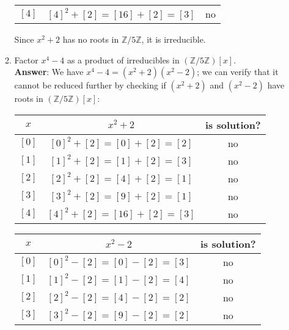 \documentclass{article}
\begin{document}
\begin{enumerate}
\begin{enumerate}
\begin{center}
\begin{tabular}{c|c|c}
                                    $[4]$ & $[4]^2+[2]=[16]+[2]=[3]$ & no
                              \end{tabular}
                        \end{center}
                        Since $x^2+2$ has no roots in $\mathbb{Z}/5\mathbb{Z}$, it is irreducible.
                  \item Factor $x^4-4$ as a product of irreducibles in $(\mathbb{Z}/5\mathbb{Z})[x]$.\\
                        \textbf{Answer}: We have $x^4-4=(x^2+2)(x^2-2)$; we can verify that it cannot be reduced further by checking if $(x^2+2)$ and $(x^2-2)$ have roots in $(\mathbb{Z}/5\mathbb{Z})[x]$:
                        \begin{center}
                              \begin{tabular}{c|c|c}
                                    $x$   & $x^2+2$                  & is solution? \\
                                    \hline
                                    $[0]$ & $[0]^2+[2]=[0]+[2]=[2]$  & no           \\
                                    $[1]$ & $[1]^2+[2]=[1]+[2]=[3]$  & no           \\
                                    $[2]$ & $[2]^2+[2]=[4]+[2]=[1]$  & no           \\
                                    $[3]$ & $[3]^2+[2]=[9]+[2]=[1]$  & no           \\
                                    $[4]$ & $[4]^2+[2]=[16]+[2]=[3]$ & no
                              \end{tabular}
                        \end{center}
                        \begin{center}
                              \begin{tabular}{c|c|c}
                                    $x$   & $x^2-2$                  & is solution? \\
                                    \hline
                                    $[0]$ & $[0]^2-[2]=[0]-[2]=[3]$  & no           \\
                                    $[1]$ & $[1]^2-[2]=[1]-[2]=[4]$  & no           \\
                                    $[2]$ & $[2]^2-[2]=[4]-[2]=[2]$  & no           \\
                                    $[3]$ & $[3]^2-[2]=[9]-[2]=[2]$  & no           \\

\end{tabular}
\end{center}
\end{enumerate}
\end{enumerate}
\end{document}
